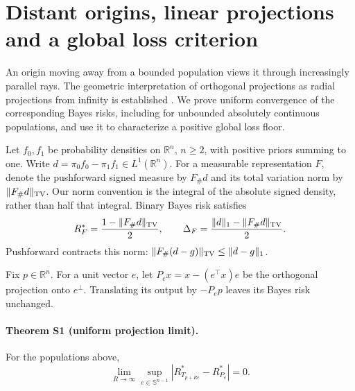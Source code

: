 \section{Distant origins, linear projections and a global loss criterion}
\label{supp:projection-boundary}

An origin moving away from a bounded population views it through increasingly parallel rays. The geometric interpretation of orthogonal projections as radial projections from infinity is established \citep{Orponen2019}. We prove uniform convergence of the corresponding Bayes risks, including for unbounded absolutely continuous populations, and use it to characterize a positive global loss floor.

Let $f_0,f_1$ be probability densities on $\mathbb R^n$, $n\geq2$, with positive priors summing to one. Write $d=\pi_0f_0-\pi_1f_1\in L^1(\mathbb R^n)$. For a measurable representation $F$, denote the pushforward signed measure by $F_\#d$ and its total variation norm by $\|F_\#d\|_{\rm TV}$. Our norm convention is the integral of the absolute signed density, rather than half that integral. Binary Bayes risk satisfies
\begin{equation}
 R_F^*=\frac{1-\|F_\#d\|_{\rm TV}}2,
 \qquad
 \Delta_F=\frac{\|d\|_1-\|F_\#d\|_{\rm TV}}2.
 \label{supp:eq:signed-push-risk}
\end{equation}
Pushforward contracts this norm: $\|F_\#(d-g)\|_{\rm TV}\leq\|d-g\|_1$.

Fix $p\in\mathbb R^n$. For a unit vector $e$, let $P_e x=x-(e^\top x)e$ be the orthogonal projection onto $e^\perp$. Translating its output by $-P_ep$ leaves its Bayes risk unchanged.

\paragraph{Theorem S1 (uniform projection limit).}
For the populations above,
\begin{equation}
 \lim_{R\to\infty}\sup_{e\in\mathbb S^{n-1}}
 \left|R^*_{T_{p+Re}}-R^*_{P_e}\right|=0.
 \label{supp:eq:uniform-projection-limit}
\end{equation}

